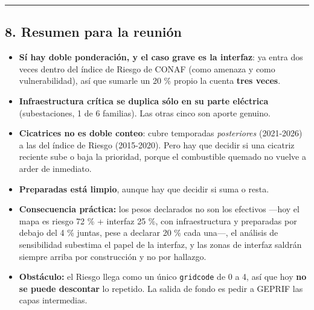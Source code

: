 \documentclass[
  spanish,
  10pt,
]{article}
\providecommand{\tightlist}{%
  \setlength{\itemsep}{0pt}\setlength{\parskip}{0pt}}
\begin{document}
\begin{center}\rule{0.5\linewidth}{0.5pt}\end{center}

\subsection{8. Resumen para la
reunión}\label{resumen-para-la-reuniuxf3n}

\begin{itemize}
\tightlist
\item
  \textbf{Sí hay doble ponderación, y el caso grave es la interfaz}: ya
  entra dos veces dentro del índice de Riesgo de CONAF (como amenaza y
  como vulnerabilidad), así que sumarle un 20 \% propio la cuenta
  \textbf{tres veces}.
\item
  \textbf{Infraestructura crítica se duplica sólo en su parte eléctrica}
  (subestaciones, 1 de 6 familias). Las otras cinco son aporte genuino.
\item
  \textbf{Cicatrices no es doble conteo}: cubre temporadas
  \emph{posteriores} (2021-2026) a las del índice de Riesgo (2015-2020).
  Pero hay que decidir si una cicatriz reciente sube o baja la
  prioridad, porque el combustible quemado no vuelve a arder de
  inmediato.
\item
  \textbf{Preparadas está limpio}, aunque hay que decidir si suma o
  resta.
\item
  \textbf{Consecuencia práctica:} los pesos declarados no son los
  efectivos ---hoy el mapa es riesgo 72 \% + interfaz 25 \%, con
  infraestructura y preparadas por debajo del 4 \% juntas, pese a
  declarar 20 \% cada una---, el análisis de sensibilidad subestima el
  papel de la interfaz, y las zonas de interfaz saldrán siempre arriba
  por construcción y no por hallazgo.
\item
  \textbf{Obstáculo:} el Riesgo llega como un único \texttt{gridcode} de
  0 a 4, así que hoy \textbf{no se puede descontar} lo repetido. La
  salida de fondo es pedir a GEPRIF las capas intermedias.
\end{itemize}
\end{document}
